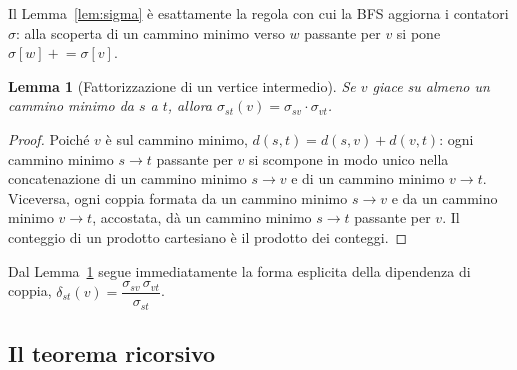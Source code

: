 \documentclass[11pt,a4paper]{report}
\newtheorem{lemma}{Lemma}
\begin{document}
Il Lemma~\ref{lem:sigma} è esattamente la regola con cui la BFS aggiorna i
contatori $\sigma$: alla scoperta di un cammino minimo verso $w$ passante per $v$
si pone $\sigma[w]\mathrel{+}=\sigma[v]$.

\begin{lemma}[Fattorizzazione di un vertice intermedio]\label{lem:fattore}
	Se $v$ giace su almeno un cammino minimo da $s$ a $t$, allora
	$\sigma_{st}(v)=\sigma_{sv}\cdot\sigma_{vt}$.
\end{lemma}
\begin{proof}
	\renewcommand{\qedsymbol}{}
	Poiché $v$ è sul cammino minimo, $d(s,t)=d(s,v)+d(v,t)$: ogni cammino minimo
	$s\to t$ passante per $v$ si scompone in modo unico nella concatenazione di un
	cammino minimo $s\to v$ e di un cammino minimo $v\to t$. Viceversa, ogni coppia
	formata da un cammino minimo $s\to v$ e da un cammino minimo $v\to t$, accostata,
	dà un cammino minimo $s\to t$ passante per $v$. Il conteggio di un prodotto
	cartesiano è il prodotto dei conteggi.
\end{proof}

Dal Lemma~\ref{lem:fattore} segue immediatamente la forma esplicita della
dipendenza di coppia, $\delta_{st}(v)=\dfrac{\sigma_{sv}\,\sigma_{vt}}{\sigma_{st}}$.

\subsection*{Il teorema ricorsivo}
\end{document}
